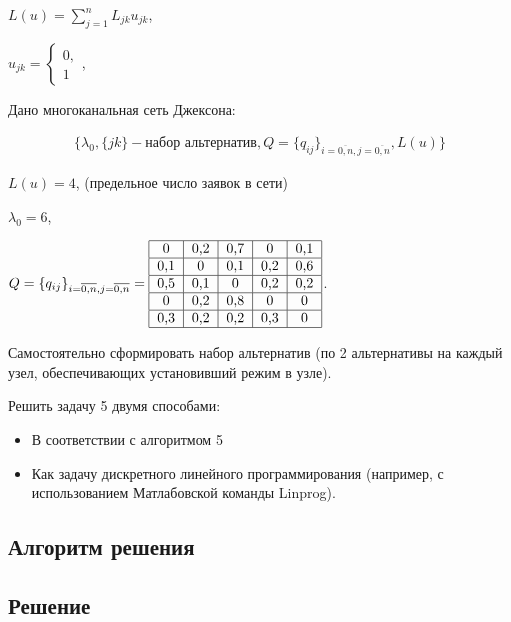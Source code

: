 \documentclass[a4paper, 12pt]{article}		%
\begin{document}
$ L(u) = \sum\limits_{j=1}^n L_{jk} u_{jk}$,

$ u_{jk} =
  \begin{cases}
    0,\\
    1
 \end{cases}$,
 
Дано многоканальная сеть Джексона:

\begin{gather*}
\{ \lambda_0, \{jk\} - \text{набор альтернатив}, Q=\{q_{ij}\}_{i=\overline{0,n}, j=\overline{0,n}}, L(u) \}
\end{gather*} 

$L(u) = 4$, (предельное число заявок в сети)

$\lambda_0 = 6$,

$Q=\{q_{ij}\}_{i=\overline{0,n}, j=\overline{0,n}} = \begin{tabular}{|c|c|c|c|c|}
\hline 
0 & 0,2 & 0,7 & 0 & 0,1 \\ 
\hline 
0,1 & 0 & 0,1 & 0,2 & 0,6 \\ 
\hline 
0,5 & 0,1 & 0 & 0,2 & 0,2 \\ 
\hline 
0 & 0,2 & 0,8 & 0 & 0 \\ 
\hline 
0,3 & 0,2 & 0,2 & 0,3 & 0 \\ 
\hline 
\end{tabular} $.

Самостоятельно сформировать набор альтернатив (по 2 альтернативы на каждый узел, обеспечивающих установивший режим в узле).

Решить задачу 5 двумя способами:

\begin{itemize}
\item В соответствии с алгоритмом 5
\item Как задачу дискретного линейного программирования (например, с использованием Матлабовской команды Linprog).
\end{itemize}

\subsection{Алгоритм решения}

\subsection{Решение}


%
\newpage
\end{document}
